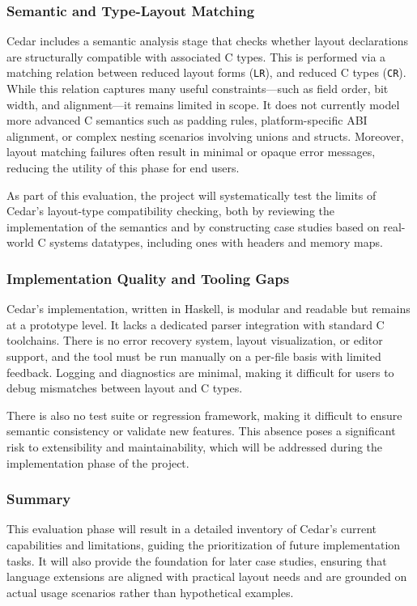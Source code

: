 \documentclass[12pt]{article}
\begin{document}
\subsubsection{Semantic and Type-Layout Matching}
Cedar includes a semantic analysis stage that checks whether layout declarations
are structurally compatible with associated C types. This is performed via a
matching relation between reduced layout forms (\texttt{LR}), and reduced C
types (\texttt{CR}). While this relation captures many useful constraints---such
as field order, bit width, and alignment---it remains limited in scope.
It does not currently model more advanced C semantics such as padding rules,
platform-specific ABI alignment, or complex nesting scenarios involving
unions and structs. Moreover, layout matching failures often result in minimal
or opaque error messages, reducing the utility of this phase for end users.

As part of this evaluation, the project will systematically test the limits of
Cedar's layout-type compatibility checking, both by reviewing the implementation 
of the semantics and by constructing case studies based on real-world C systems 
datatypes, including ones with headers and memory maps.

\subsubsection{Implementation Quality and Tooling Gaps}
Cedar's implementation, written in Haskell, is modular and readable but remains
at a prototype level. It lacks a dedicated parser integration with standard C
toolchains. There is no error recovery system, layout visualization, or editor
support, and the tool must be run manually on a per-file basis with limited
feedback. Logging and diagnostics are minimal, making it difficult for users
to debug mismatches between layout and C types.

There is also no test suite or regression framework, making it difficult to
ensure semantic consistency or validate new features. This absence poses
a significant risk to extensibility and maintainability, which will be addressed
during the implementation phase of the project. 

\subsubsection{Summary}
This evaluation phase will result in a detailed inventory of Cedar's current
capabilities and limitations, guiding the prioritization of future
implementation tasks. It will also provide the foundation for later case studies,
ensuring that language extensions are aligned with practical layout needs
and are grounded on actual usage scenarios rather than hypothetical examples.
\end{document}
